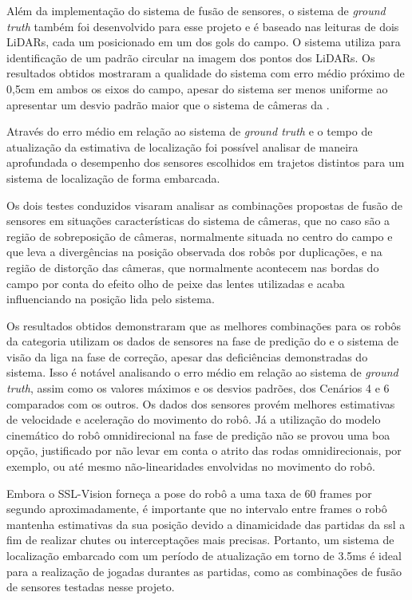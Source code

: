 \documentclass[acronym, symbols, table, deposito]{fei}
\begin{document}
	Além da implementação do sistema de fusão de sensores, o sistema de \textit{ground truth} também foi desenvolvido para esse projeto e é baseado nas leituras de dois LiDARs, cada um posicionado em um dos gols do campo. O sistema utiliza  para identificação de um padrão circular na imagem dos pontos dos LiDARs. Os resultados obtidos mostraram a qualidade do sistema com erro médio próximo de 0,5cm em ambos os eixos do campo, apesar do sistema ser menos uniforme ao apresentar um desvio padrão maior que o sistema de câmeras da .
	
	Através do erro médio em relação ao sistema de \textit{ground truth} e o tempo de atualização da estimativa de localização foi possível analisar de maneira aprofundada o desempenho dos sensores escolhidos em trajetos distintos para um sistema de localização de forma embarcada.
	
	Os dois testes conduzidos visaram analisar as combinações propostas de fusão de sensores em situações características do sistema de câmeras, que no caso são a região de sobreposição de câmeras, normalmente situada no centro do campo e que leva a divergências na posição observada dos robôs por duplicações, e na região de distorção das câmeras, que normalmente acontecem nas bordas do campo por conta do efeito olho de peixe das lentes utilizadas e acaba influenciando na posição lida pelo sistema.
	
	Os resultados obtidos demonstraram que as melhores combinações para os robôs da categoria  utilizam os dados de sensores na fase de predição do  e o sistema de visão da liga na fase de correção, apesar das deficiências demonstradas do sistema. Isso é notável analisando o erro médio em relação ao sistema de \textit{ground truth}, assim como os valores máximos e os desvios padrões, dos Cenários 4 e 6 comparados com os outros. Os dados dos sensores provém melhores estimativas de velocidade e aceleração do movimento do robô. Já a utilização do modelo cinemático do robô omnidirecional na fase de predição não se provou uma boa opção, justificado por não levar em conta o atrito das rodas omnidirecionais, por exemplo, ou até mesmo não-linearidades envolvidas no movimento do robô.
	
	Embora o SSL-Vision forneça a pose do robô a uma taxa de 60 frames por segundo aproximadamente, é importante que no intervalo entre frames o robô mantenha estimativas da sua posição devido a dinamicidade das partidas da \acrshort{ssl} a fim de realizar chutes ou interceptações mais precisas. Portanto, um sistema de localização embarcado com um período de atualização em torno de 3.5ms é ideal para a realização de jogadas durantes as partidas, como as combinações de fusão de sensores testadas nesse projeto.
	
\end{document}
